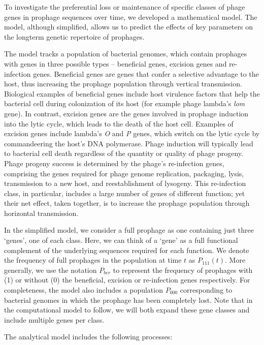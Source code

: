 To investigate the preferential loss or maintenance of specific classes of phage genes in prophage sequences over time, we developed a mathematical model.  The model, although simplified, allows us to predict the effects of key parameters on the longterm genetic repertoire of prophages.

The model tracks a population of bacterial genomes, which contain prophages with genes in three possible types -- beneficial genes, excision genes and re-infection genes. Beneficial genes are genes that confer a selective advantage to the host, thus increasing the prophage population through vertical transmission. Biological examples of beneficial genes include host virulence factors that help the bacterial cell during colonization of its host (for example phage lambda's \emph{lom} gene). In contrast, excision genes are the genes involved in prophage induction into the lytic cycle, which leads to the death of the host cell. Examples of excision genes include lambda's \emph{O} and \emph{P} genes, which switch on the lytic cycle by commandeering the host's DNA polymerase. Phage induction will typically lead to bacterial cell death regardless of the quantity or quality of phage progeny.  Phage progeny success is determined by the phage's re-infection genes, comprising the genes required for phage genome replication, packaging, lysis, transmission to a new host, and reestablishment of lysogeny.  This re-infection class, in particular, includes a large number of genes of different function; yet their net effect, taken together, is to increase the prophage population through horizontal transmission.



In the simplified model, we consider a full prophage as one containing just three `genes', one of each class.  Here, we can think of a `gene' as a full functional complement of the underlying sequences required for each function.  We denote the frequency of full prophages in the population at time $t$ as $P_{1 1 1}(t)$. More generally, we use the notation $P_{ber}$ to represent the frequency of prophages with (1) or without (0) the beneficial, excision or re-infection genes respectively.  For completeness, the model also includes a population $P_{000}$ corresponding to bacterial genomes in which the prophage has been completely lost.  Note that in the computational model to follow, we will both expand these gene classes and include multiple genes per class.

The analytical model includes the following processes:


